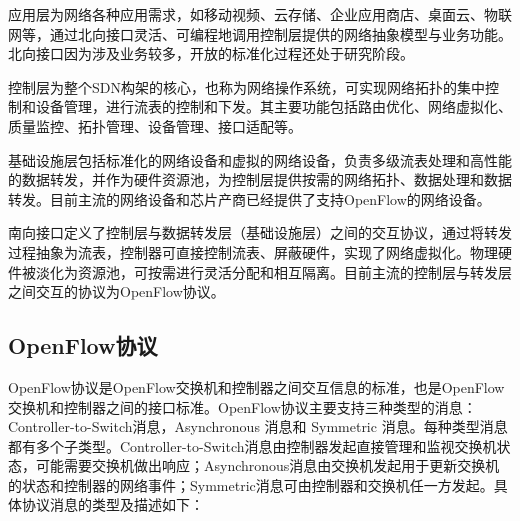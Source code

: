 应用层为网络各种应用需求，如移动视频、云存储、企业应用商店、桌面云、物联网等，通过北向接口灵活、可编程地调用控制层提供的网络抽象模型与业务功能。北向接口因为涉及业务较多，开放的标准化过程还处于研究阶段。

控制层为整个SDN构架的核心，也称为网络操作系统，可实现网络拓扑的集中控制和设备管理，进行流表的控制和下发。其主要功能包括路由优化、网络虚拟化、质量监控、拓扑管理、设备管理、接口适配等。

基础设施层包括标准化的网络设备和虚拟的网络设备，负责多级流表处理和高性能的数据转发，并作为硬件资源池，为控制层提供按需的网络拓扑、数据处理和数据转发。目前主流的网络设备和芯片产商已经提供了支持OpenFlow的网络设备。

南向接口定义了控制层与数据转发层（基础设施层）之间的交互协议，通过将转发过程抽象为流表，控制器可直接控制流表、屏蔽硬件，实现了网络虚拟化。物理硬件被淡化为资源池，可按需进行灵活分配和相互隔离。目前主流的控制层与转发层之间交互的协议为OpenFlow协议\cite{openflow-9}。
\subsection{OpenFlow协议}
OpenFlow协议\cite{openflow-5}是OpenFlow交换机和控制器之间交互信息的标准，也是OpenFlow交换机和控制器之间的接口标准。OpenFlow协议主要支持三种类型的消息：Controller-to-Switch消息，Asynchronous 消息和 Symmetric 消息\cite{openflow-6}。每种类型消息都有多个子类型。Controller-to-Switch消息由控制器发起直接管理和监视交换机状态，可能需要交换机做出响应；Asynchronous消息由交换机发起用于更新交换机的状态和控制器的网络事件；Symmetric消息可由控制器和交换机任一方发起。具体协议消息的类型及描述如下：

